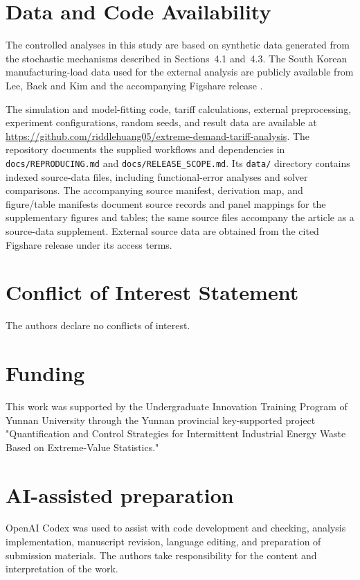 \documentclass[Times1COL]{WileyNJDv5}
\begin{document}
\section*{Data and Code Availability}
The controlled analyses in this study are based on synthetic data generated from the stochastic mechanisms described in Sections~4.1 and~4.3. The South Korean manufacturing-load data used for the external analysis are publicly available from Lee, Baek and Kim \cite{Lee2022KoreanFactories} and the accompanying Figshare release \cite{LeeFigshareV9}.

The simulation and model-fitting code, tariff calculations, external
preprocessing, experiment configurations, random seeds, and result
data are available at
\url{https://github.com/riddlehuang05/extreme-demand-tariff-analysis}.
The repository documents the supplied workflows and dependencies in
\texttt{docs/REPRODUCING.md} and \texttt{docs/RELEASE\_SCOPE.md}.
Its \texttt{data/} directory contains indexed source-data files,
including functional-error analyses and solver comparisons. The
accompanying source manifest, derivation map, and figure/table
manifests document source records and panel mappings for the
supplementary figures and tables; the same source files accompany the
article as a source-data supplement. External source data are obtained
from the cited Figshare release under its access terms.

\section*{Conflict of Interest Statement}
The authors declare no conflicts of interest.


\section*{Funding}
This work was supported by the Undergraduate Innovation Training Program of Yunnan University through the Yunnan provincial key-supported project "Quantification and Control Strategies for Intermittent Industrial Energy Waste Based on Extreme-Value Statistics."

\section*{AI-assisted preparation}
OpenAI Codex was used to assist with code development and checking, analysis implementation, manuscript revision, language editing, and preparation of submission materials. The authors take responsibility for the content and interpretation of the work.
\end{document}
